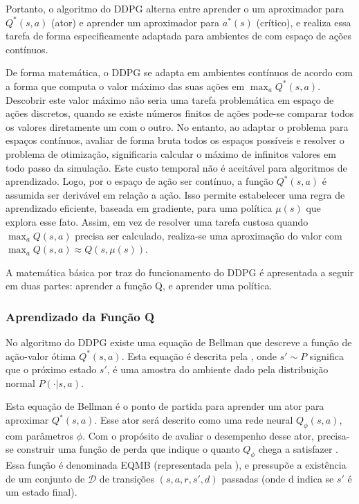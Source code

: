 
Portanto, o algoritmo do \acrshort{DDPG} alterna entre aprender o um aproximador para $Q^*(s,a)$ (ator) e aprender um aproximador para $a^*(s)$ (crítico), e realiza essa tarefa de forma especificamente adaptada para ambientes de com espaço de ações contínuos.

De forma matemática, o \acrshort{DDPG} se adapta em ambientes contínuos de acordo com a forma que computa o valor máximo das suas ações em $\max_a Q^*(s,a)$. Descobrir este valor máximo não seria uma tarefa problemática em espaço de ações discretos, quando se existe números finitos de ações pode-se comparar todos os valores diretamente um com o outro. No entanto, ao adaptar o problema para espaços contínuos, avaliar de forma bruta todos os espaços possíveis e resolver o problema de otimização, significaria calcular o máximo de infinitos valores em todo passo da simulação. Este custo temporal não é aceitável para algoritmos de aprendizado. Logo, por o espaço de ação ser contínuo, a função $Q^*(s,a)$ é assumida ser derivável em relação a ação. Isso permite estabelecer uma regra de aprendizado eficiente, baseada em gradiente, para uma política $\mu(s)$ que explora esse fato. Assim, em vez de resolver uma tarefa custosa quando $\max_a Q(s,a)$ precisa ser calculado, realiza-se uma aproximação do valor com $\max_a Q(s,a) \approx Q(s,\mu(s))$.

A matemática básica por traz do funcionamento do \acrshort{DDPG} é apresentada a seguir em duas partes: aprender a função Q, e aprender uma política.

\subsubsection{Aprendizado da Função Q}

No algoritmo do \acrshort{DDPG} existe uma equação de Bellman que descreve a função de ação-valor ótima $Q^*(s,a)$. Esta equação é descrita pela , onde $s' \sim P$ significa que o próximo estado $s'$, é uma amostra do ambiente dado pela distribuição normal $P(\cdot| s,a)$.


Esta equação de Bellman é o ponto de partida para aprender um ator para aproximar $Q^*(s,a)$. Esse ator será descrito como uma rede neural $Q_{\phi}(s,a)$, com parâmetros $\phi$. Com o propósito de avaliar o desempenho desse ator, precisa-se construir uma função de perda que indique o quanto $Q_{\phi}$ chega a satisfazer . Essa função é denominada \acrfull{EQMB} (representada pela ), e pressupõe a existência de um conjunto de ${\mathcal D}$ de transições $(s,a,r,s',d)$ passadas (onde d indica se $s'$ é um estado final). 

